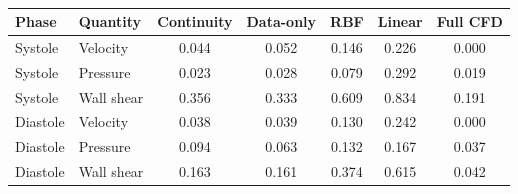 \begin{table}[htbp]
\centering
\small
\caption{}
\label{tab:recon_summary}
\begin{tabular}{llccccc}
\toprule
Phase & Quantity & Continuity & Data-only & RBF & Linear & Full CFD \\
\midrule
Systole & Velocity & 0.044 & 0.052 & 0.146 & 0.226 & 0.000 \\
Systole & Pressure & 0.023 & 0.028 & 0.079 & 0.292 & 0.019 \\
Systole & Wall shear & 0.356 & 0.333 & 0.609 & 0.834 & 0.191 \\
Diastole & Velocity & 0.038 & 0.039 & 0.130 & 0.242 & 0.000 \\
Diastole & Pressure & 0.094 & 0.063 & 0.132 & 0.167 & 0.037 \\
Diastole & Wall shear & 0.163 & 0.161 & 0.374 & 0.615 & 0.042 \\
\bottomrule
\end{tabular}
\end{table}
